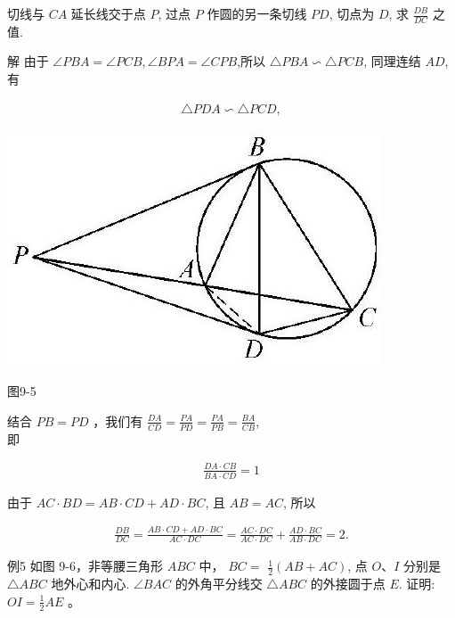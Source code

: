 \documentclass[10pt]{article}
\begin{document}
切线与 $C A$ 延长线交于点 $P$, 过点 $P$ 作圆的另一条切线 $P D$, 切点为 $D$, 求 $\frac{D B}{D C}$ 之值.

解 由于 $\angle P B A=\angle P C B, \angle B P A=\angle C P B$,所以 $\triangle P B A \backsim \triangle P C B$, 同理连结 $A D$, 有

\begin{align*}
\triangle P D A \backsim \triangle P C D,
\end{align*}

\begin{center}
\includegraphics[max width=\textwidth]{2024_10_30_66b8e5e701da2093c133g-067}
\end{center}

图9-5

结合 $P B=P D$ ，我们有 $\frac{D A}{C D}=\frac{P A}{P D}=\frac{P A}{P B}=\frac{B A}{C B}$,\\
即

\begin{align*}
\frac{D A \cdot C B}{B A \cdot C D}=1
\end{align*}

由于 $A C \cdot B D=A B \cdot C D+A D \cdot B C$, 且 $A B=A C$, 所以

\begin{align*}
\frac{D B}{D C}=\frac{A B \cdot C D+A D \cdot B C}{A C \cdot D C}=\frac{A C \cdot D C}{A C \cdot D C}+\frac{A D \cdot B C}{A B \cdot D C}=2 .
\end{align*}

例5 如图 9-6，非等腰三角形 $A B C$ 中， $B C=$ $\frac{1}{2}(A B+A C)$, 点 $O 、 I$ 分别是 $\triangle A B C$ 地外心和内心. $\angle B A C$ 的外角平分线交 $\triangle A B C$ 的外接圆于点 $E$. 证明: $O I=\frac{1}{2} A E$ 。
\end{document}
